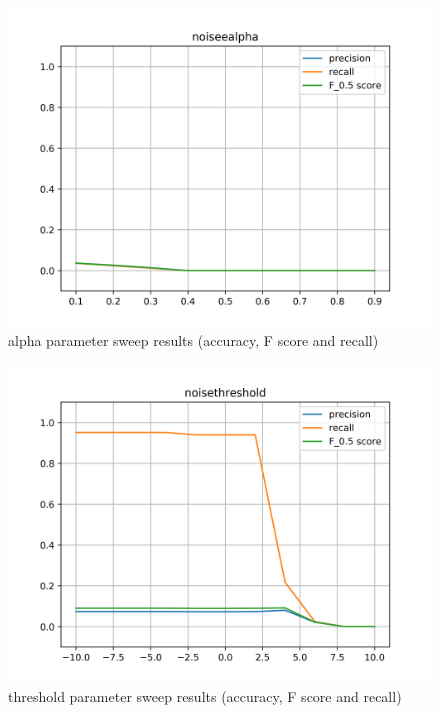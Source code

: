 \begin{figure}[!ht]
	\includegraphics[clip,width=\columnwidth]{Figures/noiseealpha.png}%
	\caption{alpha parameter sweep results (accuracy, F score and recall)}
	\label{fig:accomp}
\end{figure}

\begin{figure}[!ht]
	\includegraphics[clip,width=\columnwidth]{Figures/noisethreshold.png}%
	\caption{threshold parameter sweep results (accuracy, F score and recall)}
	\label{fig:accomp}
\end{figure}

